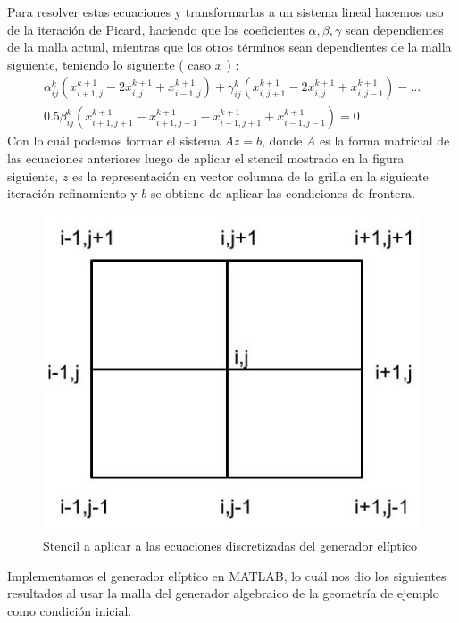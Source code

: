 \documentclass[11pt,letterpaper]{article}
\begin{document}
		Para resolver estas ecuaciones y transformarlas a un sistema lineal hacemos uso de la iteraci\'on de Picard, haciendo que los coeficientes $\alpha, \beta, \gamma$
		sean dependientes de la malla actual, mientras que los otros t\'erminos sean dependientes de la malla siguiente, teniendo lo siguiente ( caso $x$ ) :
		\begin{gather*}
			\alpha_{ij}^{k} ( x_{i+1,j}^{k+1} - 2 x_{i,j}^{k+1} + x_{i-1,j}^{k+1} ) + \gamma_{ij}^{k} ( x_{i, j + 1}^{k+1} - 2 x_{i, j}^{k+1} + x_{i,j-1}^{k+1} ) - \hdots \\
				 0.5 \beta_{ij}^{k} ( x_{i+1,j+1}^{k+1} - x_{i+1,j-1}^{k+1} - x_{i-1,j+1}^{k+1} + x_{i-1,j-1}^{k+1} ) = 0
		\end{gather*}
		Con lo cu\'al podemos formar el sistema $Az = b$, donde $A$ es la forma matricial de las ecuaciones anteriores luego de aplicar el stencil mostrado en la figura siguiente, $z$ es la representaci\'on en vector columna de la grilla en la siguiente iteraci\'on-refinamiento y $b$ se obtiene de aplicar las condiciones de frontera.
		\begin{figure}[H]
			\centering
			\includegraphics[scale=0.5]{./imgs/img_stencil.jpg}
			\caption{Stencil a aplicar a las ecuaciones discretizadas del generador el\'iptico}
			\label{fig:img_stencil}
		\end{figure}
		Implementamos el generador el\'iptico en MATLAB, lo cu\'al nos dio los siguientes resultados al usar la malla del generador algebraico de la geometr\'ia de ejemplo como condici\'on inicial.
\end{document}
